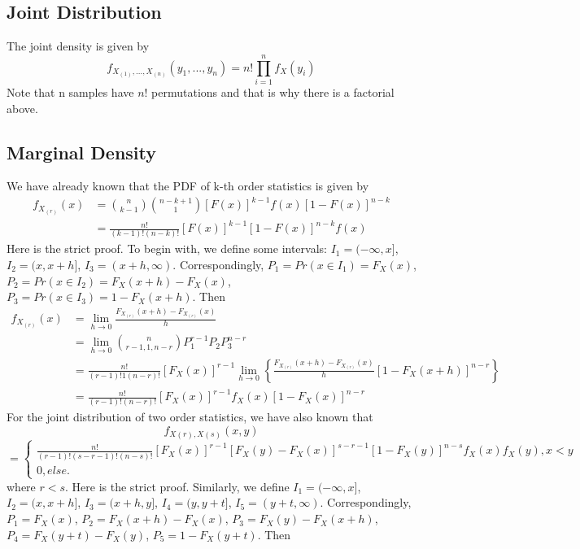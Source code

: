 \documentclass[twoside]{article}
\begin{document}
	\subsection{Joint Distribution}
	The joint density is given by
	$$
	f_{X_{(1)}, ..., X_{(n)}} (y_1, ..., y_n) = n! \prod_{i=1}^n f_X(y_i)
	$$
	Note that n samples have $n!$ permutations and that is why there is a factorial above. 
	\subsection{Marginal Density}
	We have already known that the PDF of k-th order statistics is given by
	\begin{align*}
		f_{X_{(r)}} (x) &= \binom{n}{k-1} \binom{n-k+1}{1} [F(x)]^{k-1} f(x) [1 - F(x)]^{n-k} \\
		&= \frac{n!}{(k-1)!(n-k)!} [F(x)]^{k-1} [1 - F(x)]^{n-k} f(x)
	\end{align*}
	Here is the strict proof. To begin with, we define some intervals: $I_1 = (-\infty, x]$, $I_2 = (x, x+h]$, $I_3 = (x+h, \infty)$. Correspondingly, $P_1 = Pr \left( x \in I_1 \right) = F_X(x)$, $P_2 = Pr \left( x \in I_2 \right) = F_X(x+h) - F_X(x)$, $P_3 = Pr \left( x \in I_3 \right) = 1 - F_X (x+h)$. Then
	\begin{align*}
		f_{X_{(r)}} (x) &= \lim_{h \to 0} \frac{F_{X_{(r)}} (x+h) - F_{X_{(r)}} (x)}{h} \\
		&= \lim_{h \to 0} \binom{n}{r-1, 1, n-r} P_1^{r-1} P_2 P_3^{n-r} \\
		&= \frac{n!}{(r-1)! 1 (n-r)!} \left[ F_X(x) \right]^{r-1} 
		\lim_{h \to 0} \left\{ \frac{F_{X_{(r)}} (x+h) - F_{X_{(r)}} (x)}{h} \left[ 1 - F_X (x+h) \right]^{n-r} \right\} \\
		&= \frac{n!}{(r-1)!(n-r)!} \left[ F_X(x) \right]^{r-1} f_X(x) \left[ 1-F_X(x) \right]^{n-r}
	\end{align*}
	For the joint distribution of two order statistics, we have also known that 
	$$
	f_{X(r), X(s)}(x,y)
	$$
	$$
	= \begin{cases}
		\frac{n!}{(r-1)!(s-r-1)!(n-s)!} \left[ F_X (x) \right]^{r-1} \left[ F_X(y) - F_X(x) \right]^{s-r-1} \left[ 1 - F_X(y) \right]^{n-s} f_X(x) f_X(y), x < y \\
		0, else.
	\end{cases}
	$$
	where $r < s$. Here is the strict proof. Similarly, we define $I_1 = (- \infty, x]$, $I_2 = (x, x+h]$, $I_3 = (x+h, y]$, $I_4 = (y, y+t]$, $I_5 = (y+t, \infty)$. Correspondingly, $P_1 = F_X(x)$, $P_2 = F_X(x+h) - F_X(x)$, $P_3 = F_X(y) - F_X(x+h)$, $P_4 = F_X(y+t) - F_X(y)$, $P_5 = 1 - F_X(y+t)$. Then
\end{document}
